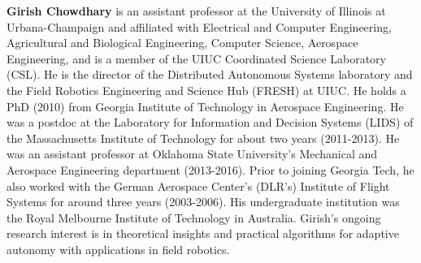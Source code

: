 \documentclass[letterpaper,12pt,peerreviewca,draftcls]{IEEEtran}
\begin{document}
\noindent \textbf{Girish Chowdhary} is an assistant professor at the University of Illinois at Urbana-Champaign and affiliated with Electrical and Computer Engineering, Agricultural and Biological Engineering, Computer Science, Aerospace Engineering, and is a member of the UIUC Coordinated Science Laboratory (CSL). He is the director of the Distributed Autonomous Systems laboratory and the Field Robotics Engineering and Science Hub (FRESH) at UIUC. He holds a PhD (2010) from Georgia Institute of Technology in Aerospace Engineering. He was a postdoc at the Laboratory for Information and Decision Systems (LIDS) of the Massachusetts Institute of Technology for about two years (2011-2013). He was an assistant professor at Oklahoma State University's Mechanical and Aerospace Engineering department (2013-2016). Prior to joining Georgia Tech, he also worked with the German Aerospace Center's (DLR's) Institute of Flight Systems for around three years (2003-2006). His undergraduate institution was the Royal Melbourne Institute of Technology in Australia. Girish's ongoing research interest is in theoretical insights and practical algorithms for adaptive autonomy with applications in field robotics. 
\end{document}
